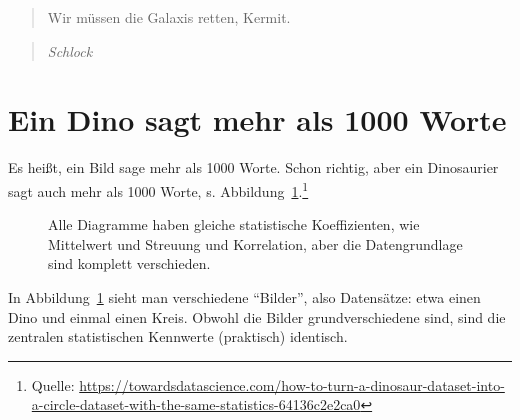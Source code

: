 \documentclass[
  a4paper,
  DIV=11]{scrreprt}
\theoremstyle{definition}
\theoremstyle{definition}
\theoremstyle{definition}
\theoremstyle{remark}
\begin{document}
\begin{quote}
{} Wir müssen die Galaxis retten, Kermit.
\end{quote}

\begin{quote}
{} \emph{Schlock}
\end{quote}

\section{Ein Dino sagt mehr als 1000
Worte}\label{ein-dino-sagt-mehr-als-1000-worte}

Es heißt, ein Bild sage mehr als 1000 Worte. Schon richtig, aber ein
Dinosaurier sagt auch mehr als 1000 Worte, s.
Abbildung~\ref{fig-dino1}.\footnote{Quelle:
  \url{https://towardsdatascience.com/how-to-turn-a-dinosaur-dataset-into-a-circle-dataset-with-the-same-statistics-64136c2e2ca0}}

\begin{figure}


\caption{\label{fig-dino1}Alle Diagramme haben gleiche statistische
Koeffizienten, wie Mittelwert und Streuung und Korrelation, aber die
Datengrundlage sind komplett verschieden.}

\end{figure}%

In Abbildung~\ref{fig-dino1} sieht man verschiedene ``Bilder'', also
Datensätze: etwa einen Dino und einmal einen Kreis. Obwohl die Bilder
grundverschiedene sind, sind die zentralen statistischen Kennwerte
(praktisch) identisch.
\end{document}
